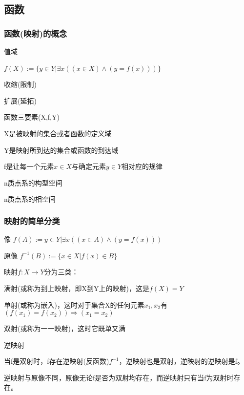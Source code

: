 \documentclass{article}
\begin{document}
	\subsection{函数}
	\subsubsection{函数(映射)的概念}
	值域\par
	$f(X):=\{y\in Y\rvert \exists x((x\in X)\wedge (y=f(x)))\}$
	~\\ \par 收缩(限制)
	~\\ \par 扩展(延拓)
	~\\ \par 函数三要素(X,f,Y)\par
	X是被映射的集合或者函数的定义域\par
	Y是映射所到达的集合或函数的到达域\par
	f是让每一个元素$x\in X$与确定元素$y\in Y$相对应的规律	
	~\\ \par
	n质点系的构型空间
	\par n质点系的相空间
	\subsubsection{映射的简单分类}
	像
	$f(A):={y\in Y\rvert \exists x((x\in A)\wedge (y=f(x)))}$\par 
	原像
	$f^{-1}(B):=\{x\in X\rvert f(x)\in B\}$~\\ \par 
	映射$f:X\rightarrow Y$分为三类：\par 
	满射(或称为到上映射，即X到Y上的映射)，这是$f(X)=Y$
	\par 单射(或称为嵌入)，这时对于集合X的任何元素$x_1,x_2$有$(f(x_1)=f(x_2))\Rightarrow (x_1=x_2)$
	\par 双射(或称为一一映射)，这时它既单又满
	~\\ \par 
	逆映射\par 当f是双射时，f存在逆映射(反函数)$f^{-1}$，逆映射也是双射，逆映射的逆映射是f。
	~\\ \par 
	逆映射与原像不同，原像无论f是否为双射均存在，而逆映射只有当f为双射时存在。	
\end{document}
